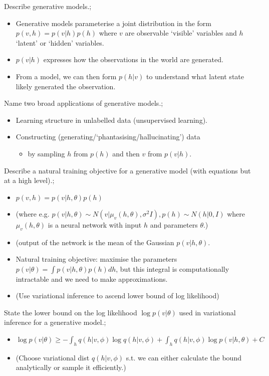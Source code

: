 \documentclass{article}
\begin{document}
Describe generative models.; \begin{itemize}
    \item Generative models parameterise a joint distribution in the form $p(v, h)=p(v|h)p(h)$ where $v$ are observable `visible' variables and $h$ `latent' or `hidden' variables.
    \item $p(v|h)$ expresses how the observations in the world are generated.
    \item From a model, we can then form $p(h|v)$ to understand what latent state likely generated the observation.
\end{itemize}

Name two broad applications of generative models.; \begin{itemize}
    \item Learning structure in unlabelled data (unsupervised learning).
    \item Constructing (generating/`phantasising/hallucinating') data \begin{itemize}
        \item by sampling $h$ from $p(h)$ and then $v$ from $p(v|h)$.
    \end{itemize}
\end{itemize}

Describe a natural training objective for a generative model (with equations but at a high level).; \begin{itemize}
    \item $p(v, h) = p(v|h, \theta)p(h)$ 
    \item (where e.g. $p(v|h, \theta) \sim N(v| \mu_v(h,\theta), \sigma^2I), p(h)\sim N(h|0, I)$ where $\mu_v(h, \theta)$ is a neural network with input $h$ and parameters $\theta$.)
    \item (output of the network is the mean of the Gaussian $p(v|h, \theta)$.
    \item Natural training objective: maximise the parameters $p(v|\theta) = \int p(v|h, \theta)p(h)dh$, but this integral is computationally intractable and we need to make approximations.
    \item (Use variational inference to ascend lower bound of log likelihood)
\end{itemize}

State the lower bound on the log likelihood $\log p(v|\theta)$ used in variational inference for a generative model.; \begin{itemize}
    \item $\log p(v|\theta) \geq - \int_h q(h|v, \phi)\log q(h|v, \phi) + \int_h q(h|v, \phi)\log p(v|h, \theta) + C$
    \item (Choose variational dist $q(h|v, \phi)$ s.t. we can either calculate the bound analytically or sample it efficiently.)
\end{itemize}
\end{document}
